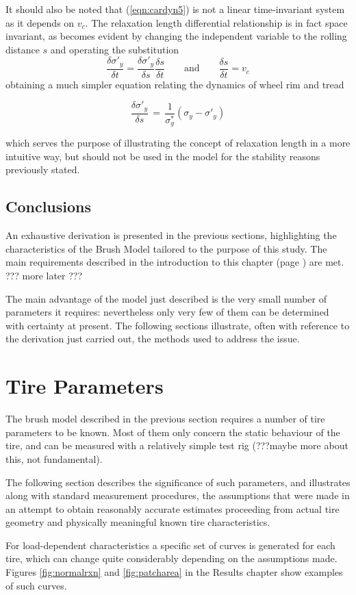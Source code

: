 \documentclass[12pt,a4paper]{report}
\newcommand{\eq}[2]{
\begin{equation} \label{#1}
#2
\end{equation}
}
\newcommand{\req}[1]{
(\ref{#1})
}
\newcommand{\dif}[2]{
\frac{\delta#1}{\delta#2} 
}
\begin{document}
It should also be noted that \req{eqn:cardyn5} is not a linear time-invariant system as it depends on $v_c$.
The relaxation length differential relationship is in fact space invariant, as becomes evident by changing the independent variable to the rolling distance $s$ and operating the substitution
$$
\dif{\sigma'_y}{t} = \dif{\sigma'_y}{s} \dif{s}{t} \qquad \mathrm{and} \qquad \dif{s}{t} = v_c
$$
obtaining a much simpler equation relating the dynamics of wheel rim and tread
\eq{eqn:cardyn7}{\dif{\sigma'_y}{s} \, = \, \frac{1}{\sigma^*_y}(\sigma_y - \sigma'_y)}
which serves the purpose of illustrating the concept of relaxation length in a more intuitive way, but should not be used in the model for the stability reasons previously stated.


\subsection{Conclusions}
An exhaustive derivation is presented in the previous sections, highlighting the characteristics of the Brush Model tailored to the purpose of this study. The main requirements described in the introduction to this chapter (page \pageref{tireintro}) are met.
??? more later ???

The main advantage of the model just described is the very small number of parameters it requires: nevertheless only very few of them can be determined with certainty at present. The following sections illustrate, often with reference to the derivation just carried out, the methods used to address the issue.

\section{Tire Parameters} \label{sec:parameasures}
The brush model described in the previous section requires a number of tire parameters to be known. Most of them only concern the static behaviour of the tire, and can be measured with a relatively simple test rig (???maybe more about this, not fundamental).

The following section describes the significance of such parameters, and illustrates along with standard measurement procedures, the assumptions that were made in an attempt to obtain reasonably accurate estimates proceeding from actual tire geometry and physically meaningful known tire characteristics.

For load-dependent characteristics a specific set of curves is generated for each tire, which can change quite considerably depending on the assumptions made. Figures \ref{fig:normalrxn} and \ref{fig:patcharea} in the Results chapter show examples of such curves.
\end{document}
